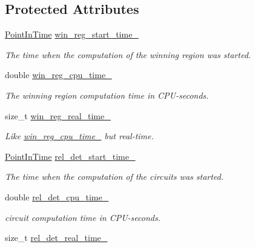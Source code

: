 \subsection*{Protected Attributes}
\begin{DoxyCompactItemize}
\item 
\hyperlink{Stopwatch_8h_af3a9f634f27bed7e98dbc23e5c6f807d}{Point\-In\-Time} \hyperlink{classLearnStatisticsQBF_a2c1d2ca27ab1a5edf496ffd603ba0878}{win\-\_\-reg\-\_\-start\-\_\-time\-\_\-}
\begin{DoxyCompactList}\small\item\em The time when the computation of the winning region was started. \end{DoxyCompactList}\item 
double \hyperlink{classLearnStatisticsQBF_a679a221c1cbf3330572f93d850976289}{win\-\_\-reg\-\_\-cpu\-\_\-time\-\_\-}
\begin{DoxyCompactList}\small\item\em The winning region computation time in C\-P\-U-\/seconds. \end{DoxyCompactList}\item 
size\-\_\-t \hyperlink{classLearnStatisticsQBF_a58013212d789d3c025b521cd150dc12d}{win\-\_\-reg\-\_\-real\-\_\-time\-\_\-}
\begin{DoxyCompactList}\small\item\em Like \hyperlink{classLearnStatisticsQBF_a679a221c1cbf3330572f93d850976289}{win\-\_\-reg\-\_\-cpu\-\_\-time\-\_\-} but real-\/time. \end{DoxyCompactList}\item 
\hyperlink{Stopwatch_8h_af3a9f634f27bed7e98dbc23e5c6f807d}{Point\-In\-Time} \hyperlink{classLearnStatisticsQBF_a11e1295e566e5456cdb2aca0034bf306}{rel\-\_\-det\-\_\-start\-\_\-time\-\_\-}
\begin{DoxyCompactList}\small\item\em The time when the computation of the circuits was started. \end{DoxyCompactList}\item 
double \hyperlink{classLearnStatisticsQBF_a38d959613268b6a6aa0decfcbe5d631c}{rel\-\_\-det\-\_\-cpu\-\_\-time\-\_\-}
\begin{DoxyCompactList}\small\item\em circuit computation time in C\-P\-U-\/seconds. \end{DoxyCompactList}\item 
size\-\_\-t \hyperlink{classLearnStatisticsQBF_a2de1d6eb803d78fdf775b8d703adda69}{rel\-\_\-det\-\_\-real\-\_\-time\-\_\-}

\end{DoxyCompactItemize}

